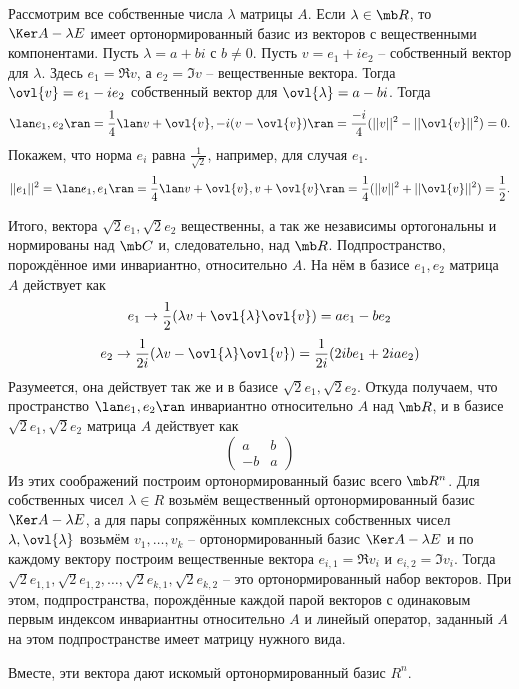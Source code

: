 Рассмотрим все собственные числа $\lambda$ матрицы $A$. Если $\lambda\in \mb R$, то $\Ker A-\lambda E$ имеет ортонормированный базис из векторов с вещественными компонентами. Пусть  $\lambda = a+bi$ с $b\neq 0$. Пусть  $v=e_1 + i e_2 $ -- собственный вектор для $\lambda$. Здесь $e_1=\Re v$, а $e_2=\Im v$ -- вещественные вектора. Тогда $\ovl{v}=e_1-ie_2$ собственный вектор для $\ovl{\lambda}=a-bi$. Тогда
$$\lan e_1, e_2\ran = \frac{1}{4} \lan v+\ovl{v}, -i( v-\ovl{v})\ran= \frac{-i}{4}(||v||^2-||\ovl{v}||^2)=0.$$
Покажем, что норма $e_i$ равна $\frac{1}{\sqrt{2}}$, например, для случая $e_1$. 
$$||e_1||^2=\lan e_1, e_1\ran = \frac{1}{4} \lan v+\ovl{v},  v+\ovl{v}\ran= \frac{1}{4}(||v||^2+||\ovl{v}||^2)=\frac{1}{2}.$$

Итого, вектора $\sqrt{2}e_1,\sqrt{2}e_2$ вещественны, а так же независимы ортогональны и нормированы над $\mb C$ и, следовательно, над $\mb R$. Подпространство, порождённое ими инвариантно, относительно $A$. На нём в базисе $e_1, e_2$ матрица $A$ действует как 
$$e_1 \to \frac{1}{2}(\lambda v + \ovl{\lambda}\ovl{v})=ae_1 - be_2 $$
$$e_2 \to \frac{1}{2i}(\lambda v - \ovl{\lambda}\ovl{v})=\frac{1}{2i}( 2i b e_1 + 2i  a e_2) $$
Разумеется, она действует так же и в базисе $\sqrt{2}e_1,\sqrt{2}e_2$. Откуда получаем, что пространство $\lan e_1,e_2\ran $ инвариантно относительно $A$ над $\mb R$, и в базисе $\sqrt{2}e_1,\sqrt{2}e_2$ матрица $A$  действует как  
$$\begin{pmatrix}
a & b\\
-b & a
\end{pmatrix}$$
Из этих соображений построим ортонормированный базис всего $\mb R^n$. Для собственных чисел $\lambda \in R$ возьмём вещественный ортонормированный базис $\Ker A-\lambda E$, а для пары сопряжённых комплексных собственных чисел $\lambda,\ovl{\lambda}$ возьмём $v_1,\dots,v_k$ -- ортонормированный базис $\Ker A-\lambda E$ и по каждому вектору построим вещественные вектора $e_{i,1}=\Re v_i$ и $e_{i,2}=\Im v_i$. Тогда $\sqrt{2}e_{1,1}, \sqrt{2}e_{1,2},\dots, \sqrt{2}e_{k,1},\sqrt{2}e_{k,2}$ -- это ортонормированный набор векторов. При этом, подпространства, порождённые каждой парой векторов с одинаковым первым индексом инвариантны относительно $A$ и линейый оператор, заданный $A$ на этом подпространстве имеет матрицу нужного вида.

Вместе, эти вектора дают искомый ортонормированный базис $R^n$.

\endproof






